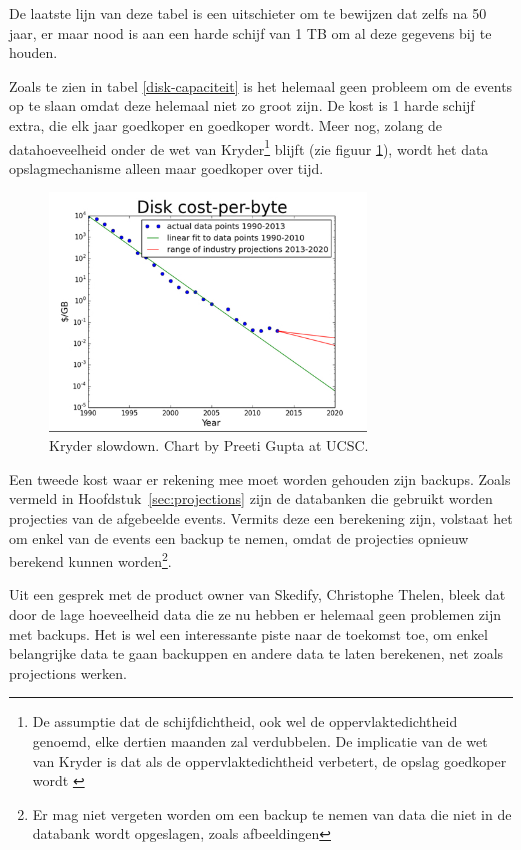 De laatste lijn van deze tabel is een uitschieter om te bewijzen dat zelfs na 50 jaar, er maar nood is aan een harde schijf van 1 TB om al deze gegevens bij te houden.

Zoals te zien in tabel \ref{disk-capaciteit} is het helemaal geen probleem om de events op te slaan omdat deze helemaal niet zo groot zijn. De kost is 1 harde schijf extra, die elk jaar goedkoper en goedkoper wordt. Meer nog, zolang de datahoeveelheid onder de wet van Kryder\footnote{De assumptie dat de schijfdichtheid, ook wel de oppervlaktedichtheid genoemd, elke dertien maanden zal verdubbelen. De implicatie van de wet van Kryder is dat als de oppervlaktedichtheid verbetert, de opslag goedkoper wordt \autocite{walter2005kryder}} blijft (zie figuur \ref{fig:krydersslowdown}), wordt het data opslagmechanisme alleen maar goedkoper over tijd.

\begin{figure}[h]
  \caption{Kryder slowdown. Chart by Preeti Gupta at UCSC.} \label{fig:krydersslowdown}
  \centering
  \includegraphics[width=0.75\textwidth]{img/kryder-slowdown}
\end{figure}

Een tweede kost waar er rekening mee moet worden gehouden zijn backups. Zoals vermeld in Hoofdstuk~\ref{sec:projections} zijn de databanken die gebruikt worden projecties van de afgebeelde events. Vermits deze een berekening zijn, volstaat het om enkel van de events een backup te nemen, omdat de projecties opnieuw berekend kunnen worden\footnote{Er mag niet vergeten worden om een backup te nemen van data die niet in de databank wordt opgeslagen, zoals afbeeldingen}.

Uit een gesprek met de product owner van Skedify, Christophe Thelen, bleek dat door de lage hoeveelheid data die ze nu hebben er helemaal geen problemen zijn met backups. Het is wel een interessante piste naar de toekomst toe, om enkel belangrijke data te gaan backuppen en andere data te laten berekenen, net zoals projections werken.

